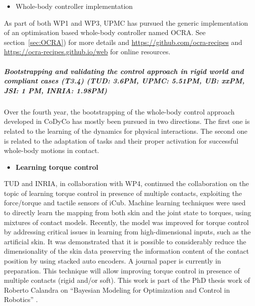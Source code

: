 \begin{itemize}
\item {Whole-body controller implementation}
\end{itemize}
As part of both WP1 and WP3, UPMC has pursued the generic implementation of an optimisation based whole-body controller named OCRA. See section~\ref{sec:OCRA}) for more details and \url{https://github.com/ocra-recipes} and \url{https://ocra-recipes.github.io/web} for online resources.

\subparagraph{Bootstrapping and validating the control approach in rigid world and compliant cases (T3.4) (TUD: 3.6PM, UPMC: 5.51PM, UB: xxPM, JSI: 1 PM, INRIA: 1.98PM)}

Over the fourth year, the bootstrapping of the whole-body control approach developed in CoDyCo has mostly been pursued in two directions. The first one is related to the learning of the dynamics for physical interactions. The second one is related to the adaptation of tasks and their proper activation for successful whole-body motions in contact.

\begin{itemize}
\item \textbf{Learning torque control}
\end{itemize}
TUD and INRIA, in collaboration with WP4, continued the collaboration on the topic of learning torque control in presence of multiple contacts, exploiting the force/torque and tactile sensors of iCub. Machine learning techniques were used to directly learn the mapping from both skin and the joint state to torques, using mixtures of contact models. Recently, the model was improved for torque control by addressing critical issues in learning from high-dimensional inputs, such as the artificial skin. It was demonstrated that it is possible to considerably reduce the dimensionality of the skin data preserving the information content of the contact position by using stacked auto encoders. A journal paper is currently in preparation. This technique will allow improving torque control in presence of multiple contacts (rigid and/or soft). This work is part of the PhD thesis work of Roberto Calandra on ``Bayesian Modeling for Optimization and Control in Robotics'' \cite{calandra2016PhD}.\\

